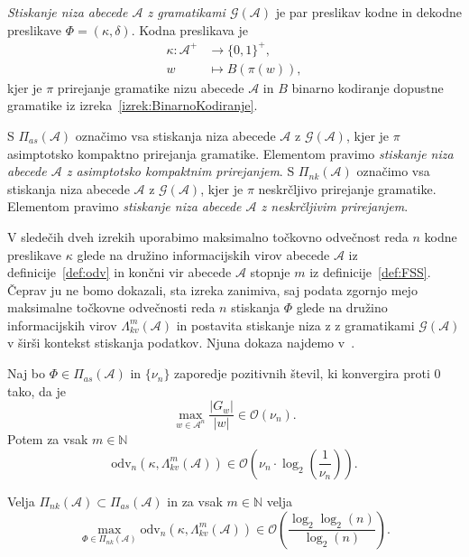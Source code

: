 \documentclass[fin1, tisk]{fmfdelo}
\providecommand{\abs}[1]{\left\lvert #1 \right\rvert}
\newcommand{\N}{\mathbb{N}}
\newcommand{\A}{\mathcal{A}}
\newcommand{\G}{\mathcal{G}}
\theoremstyle{definition}
\begin{document}
\begin{definicija}
    \emph{Stiskanje niza abecede $\A$ z gramatikami $\G(\A)$} je 
    par preslikav kodne in dekodne preslikave $\varPhi = (\kappa, \delta)$. Kodna preslikava je
    \begin{align*}
        \kappa \colon \A^+ &\to \{ 0, 1\}^+,\\
        w &\mapsto B(\pi(w)),
    \end{align*}
    kjer je $\pi$ prirejanje gramatike nizu abecede $\A$ in
    $B$ binarno kodiranje dopustne gramatike iz izreka~\ref{izrek:BinarnoKodiranje}.
\end{definicija}

\begin{definicija}
    S $\varPi_{as}(\A)$ označimo vsa stiskanja niza abecede $\A$ z $\G(\A)$,
    kjer je $\pi$ asimptotsko kompaktno prirejanja gramatike. Elementom pravimo
    \emph{stiskanje niza abecede $\A$ z asimptotsko kompaktnim prirejanjem}.
    S $\varPi_{nk}(\A)$ označimo vsa stiskanja niza abecede $\A$ z $\G(\A)$,
    kjer je $\pi$ neskrčljivo prirejanje gramatike. Elementom pravimo
    \emph{stiskanje niza abecede $\A$ z neskrčljivim prirejanjem}.
\end{definicija}

V sledečih dveh izrekih uporabimo maksimalno točkovno odvečnost reda $n$ kodne preslikave 
$\kappa$ glede na družino informacijskih virov abecede $\A$ iz definicije~\ref{def:odv} in
končni vir abecede $\A$ stopnje $m$ iz definicije~\ref{def:FSS}. Čeprav ju ne bomo dokazali,
sta izreka zanimiva, saj podata zgornjo mejo maksimalne točkovne odvečnosti reda $n$ stiskanja 
$\varPhi$ glede na družino informacijskih virov $\Lambda_{kv}^m(\A)$ in postavita stiskanje niza 
z z gramatikami $\G(\A)$ v širši kontekst stiskanja podatkov. Njuna dokaza najdemo 
v~\cite{KiefferYang2000}.

\begin{izrek}
    Naj bo $\varPhi \in \varPi_{as}(\A)$ in $\{ \nu_n \}$ zaporedje pozitivnih števil,
    ki konvergira proti $0$ tako, da je
    \[
        \max_{w \in \A^n} \frac{\abs{G_w}}{\abs{w}} \in \mathcal{O}(\nu_n).
    \]
    Potem za vsak $m \in \N$
    \[
        \text{odv}_n \left( \kappa, \Lambda_{kv}^m(\A) \right) \in
        \mathcal{O} \left( \nu_n \cdot \log_2 \left( \frac{1}{\nu_n} \right) \right).
    \]
\end{izrek}

\begin{izrek}\label{izrek:RedKonvergenca}
    Velja $\varPi_{nk}(\A) \subset \varPi_{as}(\A)$ in za vsak $m \in \N$ velja 
    \[
        \max_{\varPhi \in \varPi_{nk}(\A)} \text{odv}_n \left( \kappa, \Lambda_{kv}^m(\A) \right) \in
        \mathcal{O} \left( \frac{\log_2 \log_2(n)}{\log_2(n)} \right).
    \]
\end{izrek}
\end{document}
